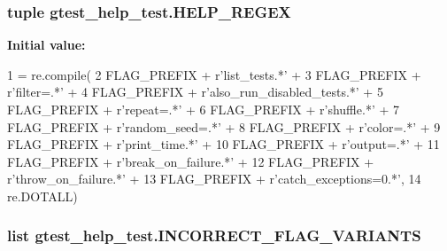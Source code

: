\hypertarget{namespacegtest__help__test_a0cc445bb25250e09cfa21c64a00e209e}{
\subsubsection[{H\-E\-L\-P\-\_\-\-R\-E\-G\-E\-X}]{\setlength{\rightskip}{0pt plus 5cm}tuple gtest\-\_\-help\-\_\-test.\-H\-E\-L\-P\-\_\-\-R\-E\-G\-E\-X}}\label{namespacegtest__help__test_a0cc445bb25250e09cfa21c64a00e209e}
{\bfseries Initial value\-:}
\begin{DoxyCode}
1 = re.compile(
2     FLAG\_PREFIX + \textcolor{stringliteral}{r'list\_tests.*'} +
3     FLAG\_PREFIX + \textcolor{stringliteral}{r'filter=.*'} +
4     FLAG\_PREFIX + \textcolor{stringliteral}{r'also\_run\_disabled\_tests.*'} +
5     FLAG\_PREFIX + \textcolor{stringliteral}{r'repeat=.*'} +
6     FLAG\_PREFIX + \textcolor{stringliteral}{r'shuffle.*'} +
7     FLAG\_PREFIX + \textcolor{stringliteral}{r'random\_seed=.*'} +
8     FLAG\_PREFIX + \textcolor{stringliteral}{r'color=.*'} +
9     FLAG\_PREFIX + \textcolor{stringliteral}{r'print\_time.*'} +
10     FLAG\_PREFIX + \textcolor{stringliteral}{r'output=.*'} +
11     FLAG\_PREFIX + \textcolor{stringliteral}{r'break\_on\_failure.*'} +
12     FLAG\_PREFIX + \textcolor{stringliteral}{r'throw\_on\_failure.*'} +
13     FLAG\_PREFIX + \textcolor{stringliteral}{r'catch\_exceptions=0.*'},
14     re.DOTALL)
\end{DoxyCode}
\hypertarget{namespacegtest__help__test_a6f677b9f975f09db7604a5ee9c4821a3}{
\subsubsection[{I\-N\-C\-O\-R\-R\-E\-C\-T\-\_\-\-F\-L\-A\-G\-\_\-\-V\-A\-R\-I\-A\-N\-T\-S}]{\setlength{\rightskip}{0pt plus 5cm}list gtest\-\_\-help\-\_\-test.\-I\-N\-C\-O\-R\-R\-E\-C\-T\-\_\-\-F\-L\-A\-G\-\_\-\-V\-A\-R\-I\-A\-N\-T\-S}}\label{namespacegtest__help__test_a6f677b9f975f09db7604a5ee9c4821a3}
